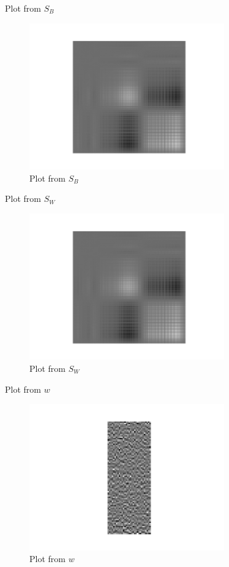 \documentclass[handout]{beamer}
\begin{document}
\begin{frame}{Plot from $S_B$}
    {\centering
    \begin{figure}[H]
        \includegraphics[width=0.75\textwidth]{project_03/s_b.png}
        \caption{Plot from $S_B$}
    \end{figure}
    }
\end{frame}

\begin{frame}{Plot from $S_W$}
    {\centering
    \begin{figure}[H]
        \includegraphics[width=0.75\textwidth]{project_03/s_b.png}
        \caption{Plot from $S_W$}
    \end{figure}
    }
\end{frame}

\begin{frame}{Plot from $w$}
    {\centering
    \begin{figure}[H]
        \includegraphics[width=0.75\textwidth]{project_03/ww.png}
        \caption{Plot from $w$}
    \end{figure}
    }
\end{frame}
\end{document}
